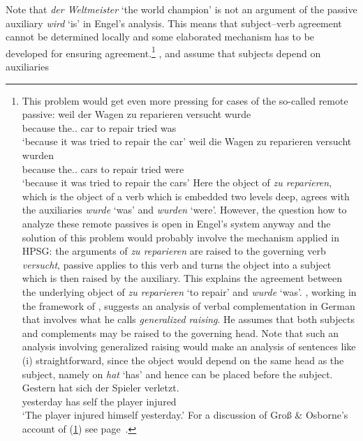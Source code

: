 Note that \emph{der Weltmeister} `the world champion' is not an argument of the passive auxiliary
\emph{wird} `is' in Engel's analysis. This means that subject--verb agreement cannot be determined
locally and some elaborated mechanism has to be developed for ensuring agreement.\footnote{%
This problem would get even more pressing for cases of the so-called remote passive:
\eal
\ex
\gll weil der Wagen zu reparieren versucht wurde\\
     because the.\sg.\nom{} car to repair tried was\\
\glt `because it was tried to repair the car'
\ex
\gll weil die Wagen zu reparieren versucht wurden\\
     because the.\pl.\nom{} cars to repair tried were\\
\glt `because it was tried to repair the cars'
\zl
Here the object of \emph{zu reparieren}, which is the object of a verb which is embedded two levels deep,
agrees with the auxiliaries \emph{wurde} `was' and \emph{wurden} `were'. However, the question how to analyze these remote
passives is open in Engel's system anyway and the solution of this problem would probably involve the mechanism
applied in HPSG: the arguments of \emph{zu reparieren} are raised to the governing verb
\emph{versucht}, passive applies to this verb and turns the object into a subject which is then
raised by the auxiliary. This explains the agreement between the underlying object of \emph{zu
  reparieren} `to repair' and \emph{wurde} `was'. \citet{Hudson97a}, working in the framework of \wg, suggests an analysis of verbal
complementation in German that involves what he calls \emph{generalized raising}. He assumes
that both subjects and complements may be raised to the governing head. Note that such an analysis
involving generalized raising would make an analysis of sentences like (i) straightforward, since
the object would depend on the same head as the subject, namely on \emph{hat} `has' and hence can be
placed before the subject.
\ea
\label{ex-gestern-hat-sich-der-spieler-verletzt}
\gll Gestern hat sich der Spieler verletzt.\\
     yesterday has self the player injured\\
\glt `The player injured himself yesterday.'
\z
For a discussion of Groß \& Osborne's account of (\ref{ex-gestern-hat-sich-der-spieler-verletzt}) see page~\pageref{fig-gestern-hat-sich-der-spieler-verletzt-dg-rising}.
} 
\citet{Hudson90a-u}, \citet[Section~5.3]{Eroms2000a} and \citet{GO2009a} assume that subjects depend on auxiliaries
